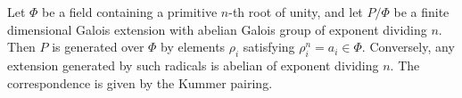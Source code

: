 Let $\Phi$ be a field containing a primitive $n$-th root of unity, and let $P/\Phi$ be a finite dimensional Galois extension with abelian Galois group of exponent dividing $n$. Then $P$ is generated over $\Phi$ by elements $\rho_i$ satisfying $\rho_i^n = a_i \in \Phi$. Conversely, any extension generated by such radicals is abelian of exponent dividing $n$. The correspondence is given by the Kummer pairing.
